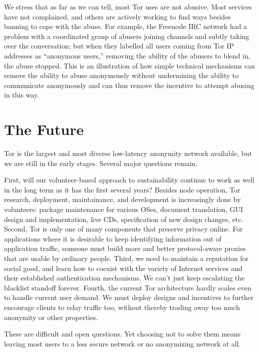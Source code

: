 \documentclass{llncs}
\begin{document}
We stress that as far as we can tell, most Tor uses are not
abusive. Most services have not complained, and others are actively
working to find ways besides banning to cope with the abuse. For
example, the Freenode IRC network had a problem with a coordinated
group of abusers joining channels and subtly taking over the
conversation; but when they labelled all users coming from Tor IP
addresses as ``anonymous users,'' removing the ability of the abusers
to blend in, the abuse stopped.  This is an illustration of how simple
technical mechanisms can remove the ability to abuse anonymously
without undermining the ability to communicate anonymously and can
thus remove the incentive to attempt abusing in this way.



\section{The Future}
\label{sec:conclusion}

Tor is the largest and most diverse low-latency anonymity network
available, but we are still in the early stages. Several major
questions remain.

First, will our volunteer-based approach to sustainability continue to
work as well in the long term as it has the first several years?
Besides node operation, Tor research, deployment, maintainance, and
development is increasingly done by volunteers: package maintenance
for various OSes, document translation, GUI design and implementation,
live CDs, specification of new design changes, etc.\
%
Second, Tor is only one of many components that preserve privacy
online.  For applications where it is desirable to keep identifying
information out of application traffic, someone must build more and
better protocol-aware proxies that are usable by ordinary people.
%
Third, we need to maintain a reputation for social good, and learn how to
coexist with the variety of Internet services and their established
authentication mechanisms. We can't just keep escalating the blacklist
standoff forever.
%
Fourth, the current Tor architecture hardly scales even to handle
current user demand. We must deploy designs and incentives to further
encourage clients to relay traffic too, without thereby trading away
too much anonymity or other properties.

These are difficult and open questions. Yet choosing not to solve them
means leaving most users to a less secure network or no anonymizing
network at all.

 
\end{document}
